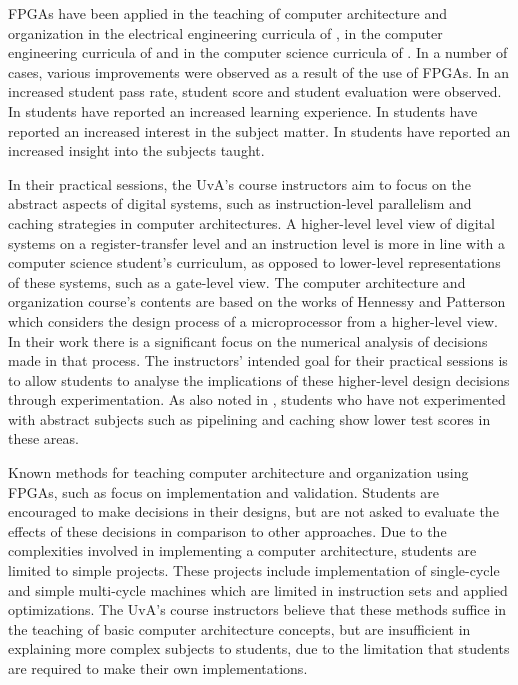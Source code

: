 \documentclass[openright]{template/uva-bachelor-thesis}
\begin{document}
FPGAs have been applied in the teaching of computer architecture and organization in the electrical engineering curricula of \cite{jansen2014every, oztekin2011bzk, el2011teaching, pereira2012basic}, in the computer engineering curricula of \cite{cifredo2015computer, kellett2012project, el2011teaching, pereira2012basic, lee2012pipelined, oztekin2011bzk} and in the computer science curricula of \cite{bulic2013fpga, el2011teaching, pereira2012basic, lee2012pipelined}. In a number of cases, various improvements were observed as a result of the use of FPGAs. In \cite{paharsingh2009novel} an increased student pass rate, student score and student evaluation were observed. In \cite{oztekin2011bzk} students have reported an increased learning experience. In \cite{cifredo2015computer} students have reported an increased interest in the subject matter. In \cite{bulic2013fpga, cifredo2015computer} students have reported an increased insight into the subjects taught. 


In their practical sessions, the UvA's course instructors aim to focus on the abstract aspects of digital systems, such as instruction-level parallelism and caching strategies in computer architectures. A higher-level level view of digital systems on a register-transfer level and an instruction level is more in line with a computer science student's curriculum, as opposed to lower-level representations of these systems, such as a gate-level view. The computer architecture and organization course's contents are based on the works of Hennessy and Patterson \cite{hennessy2013computer} which considers the design process of a microprocessor from a higher-level view. In their work there is a significant focus on the numerical analysis of decisions made in that process. The instructors' intended goal for their practical sessions is to allow students to analyse the implications of these higher-level design decisions through experimentation. As also noted in \cite{paharsingh2009novel}, students who have not experimented with abstract subjects such as pipelining and caching show lower test scores in these areas.

Known methods for teaching computer architecture and organization using FPGAs, such as \cite{paharsingh2009novel, el2011teaching, nakano2008processor, al2007teaching, kellett2012project, jansen2014every, lee2012pipelined, pereira2012basic, cifredo2015computer} focus on implementation and validation. Students are encouraged to make decisions in their designs, but are not asked to evaluate the effects of these decisions in comparison to other approaches. Due to the complexities involved in implementing a computer architecture, students are limited to simple projects. These projects include implementation of single-cycle and simple multi-cycle machines which are limited in instruction sets and applied optimizations. The UvA's course instructors believe that these methods suffice in the teaching of basic computer architecture concepts, but are insufficient in explaining more complex subjects to students, due to the limitation that students are required to make their own implementations.  
\end{document}

